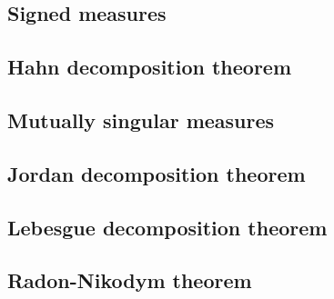 \documentclass[../Year2.tex]{subfiles}
\begin{document}
\subsection{Signed measures}

\subsection{Hahn decomposition theorem}

\subsection{Mutually singular measures}

\subsection{Jordan decomposition theorem}

\subsection{Lebesgue decomposition theorem}

\subsection{Radon-Nikodym theorem}
\end{document}
